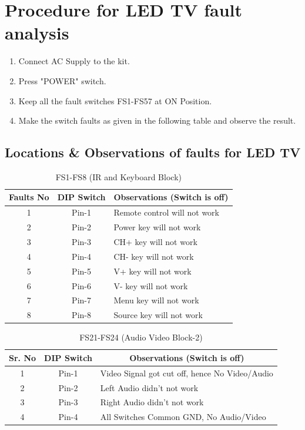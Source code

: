 \documentclass[a4paper,12pt]{article}
\begin{document}
	\section{Procedure for LED TV fault analysis}
\begin{enumerate}
	\item Connect AC Supply to the kit.
	\item Press "POWER" switch.
	\item Keep all the fault switches FS1-FS57 at ON Position.
	\item Make the switch faults as given in the following table and observe the result.
\end{enumerate}
\newpage
	\subsection{Locations \& Observations of faults for LED TV}
	
\begin{table}[H]
	\centering
	\caption{FS1-FS8 (IR and Keyboard Block)}
\begin{tabular}{|c|c|l|}
	
	\hline
	\textbf{Faults No} & \textbf{DIP Switch} & \multicolumn{1}{c|}{\textbf{ Observations (Switch is off) }} \\
	\hline
	1 & Pin-1 & Remote control will not work \\
	\hline
	2 & Pin-2 & Power key will not work \\
	\hline
	3 & Pin-3 & CH+ key will not work \\
	\hline
	4 & Pin-4 & CH- key will not work \\
	\hline
	5 & Pin-5 & V+ key will not work \\
	\hline
	6 & Pin-6 & V- key will not work \\
	\hline
	7 & Pin-7 & Menu key will not work \\
	\hline
	8 & Pin-8 & Source key will not work \\
	\hline
\end{tabular}
\end{table}

	\begin{table}[H]
		
		\centering
		\caption{FS21-FS24 (Audio Video Block-2)}
		\begin{tabular}{|c|c|l|}
			\hline
			\textbf{Sr. No} & \textbf{DIP Switch} & \multicolumn{1}{c|}{\textbf{Observations (Switch is off)}} \\
			\hline
			1 & Pin-1 & Video Signal  got cut off, hence No Video/Audio \\
			\hline
			2 & Pin-2 & Left Audio didn't not work \\
			\hline
			3 & Pin-3 & Right Audio didn't not work \\
			\hline
			4 & Pin-4 & All Switches Common GND, No Audio/Video \\
			\hline
		\end{tabular}
		
	\end{table}
	
\end{document}
